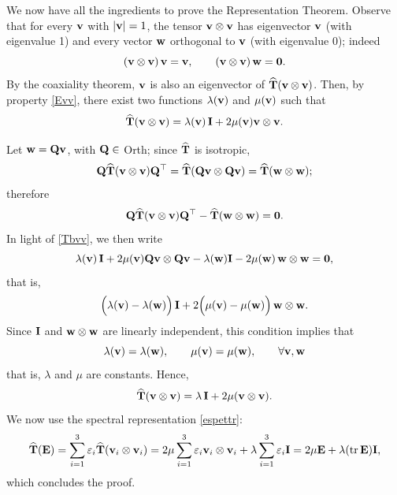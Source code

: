 We now have all the ingredients to prove the Representation Theorem. Observe that for every $\mathbf{v}$ with $|\mathbf{v}|=1$, the tensor $\mathbf{v} \otimes \mathbf{v}$ has eigenvector $\mathbf{v}$ (with eigenvalue 1) and every vector $\mathbf{w}$ orthogonal to $\mathbf{v}$ (with eigenvalue 0); indeed
\begin{equation}
	(\mathbf{v} \otimes \mathbf{v})\,\mathbf{v}=\mathbf{v}, \qquad (\mathbf{v} \otimes \mathbf{v})\,\mathbf{w}=\mathbf{0}.
\end{equation}
By the coaxiality theorem, $\mathbf{v}$ is also an eigenvector of $\widehat{\mathbf{T}}(\mathbf{v} \otimes\mathbf{v})$. Then, by property \eqref{Evv}, there exist two functions $\lambda(\mathbf{v})$ and $\mu (\mathbf{v})$ such that
\begin{equation}\label{Tbvv}
	\widehat{\mathbf{T}}(\mathbf{v} \otimes \mathbf{v})=\lambda(\mathbf{v})\, \mathbf{I}+2\mu (\mathbf{v}) \mathbf{v} \otimes \mathbf{v}.
\end{equation}

Let $\mathbf{w} =\mathbf{Q} \mathbf{v}$, with $\mathbf{Q} \in$ Orth; since $\widehat{\mathbf{T}}$ is isotropic,
\begin{equation}
	\mathbf{Q} \widehat{\mathbf{T}}(\mathbf{v} \otimes \mathbf{v})\mathbf{Q} ^\top=\widehat{\mathbf{T}}(\mathbf{Q} \mathbf{v} \otimes \mathbf{Q} \mathbf{v})=\widehat{\mathbf{T}}(\mathbf{w} \otimes \mathbf{w});
\end{equation}
therefore
\begin{equation}
	\mathbf{Q} \widehat{\mathbf{T}}(\mathbf{v} \otimes \mathbf{v})\mathbf{Q} ^\top-\widehat{\mathbf{T}}(\mathbf{w} \otimes \mathbf{w})=\mathbf{0}.
\end{equation}
In light of \eqref{Tbvv}, we then write
\begin{equation}
	\lambda(\mathbf{v}) \,\mathbf{I}+2\mu(\mathbf{v}) \mathbf{Q} \mathbf{v} \otimes \mathbf{Q} \mathbf{v} -\lambda(\mathbf{w}) \mathbf{I} -2\mu (\mathbf{w})\, \mathbf{w} \otimes \mathbf{w} =\mathbf{0},
\end{equation}
that is,
\begin{equation}
	\Big(  \lambda(\mathbf{v})-\lambda(\mathbf{w}) \Big)\,\mathbf{I}+2\Big(  \mu (\mathbf{v})-\mu (\mathbf{w}) \Big)\,\mathbf{w} \otimes \mathbf{w}.
\end{equation}
Since $\mathbf{I}$ and $\mathbf{w} \otimes \mathbf{w}$ are linearly independent, this condition implies that
\begin{equation}
	\lambda(\mathbf{v})=\lambda(\mathbf{w}), \qquad \mu(\mathbf{v})=\mu(\mathbf{w}), \qquad \forall \mathbf{v}, \mathbf{w}
\end{equation}
that is, $\lambda$ and $\mu$ are constants. Hence,
\begin{equation}
	\widehat{\mathbf{T}}(\mathbf{v} \otimes \mathbf{v})=\lambda\, \mathbf{I}+2\mu (\mathbf{v} \otimes \mathbf{v}).
\end{equation}
We now use the spectral representation \eqref{espettr}:
\begin{equation}
	\widehat{\mathbf{T}}(\mathbf{E})=\sum_{i=1}^3 \varepsilon_i \widehat{\mathbf{T}}(\mathbf{v}_i\otimes \mathbf{v}_i)=2\mu \sum_{i=1}^3 \varepsilon_i \mathbf{v}_i \otimes \mathbf{v}_i +\lambda\sum_{i=1}^3 \varepsilon_i \mathbf{I}=2\mu \mathbf{E} +\lambda(\operatorname{tr}\mathbf{E} )\mathbf{I},
\end{equation}
which concludes the proof.


